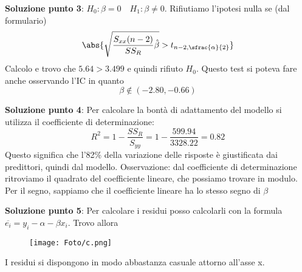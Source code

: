 \ind \textbf{Soluzione punto 3}: $H_0 :\beta = 0 \quad H_1 : \beta \neq 0$. Rifiutiamo l'ipotesi nulla se (dal formulario) $$\abs{\sqrt{\dfrac{S_{xx} (n-2)}{SS_R} \hat{\beta}} > t_{n-2, \sfrac{\alpha}{2}}}$$ Calcolo e trovo che $5.64 > 3.499$ e quindi rifiuto $H_0$. Questo test si poteva fare anche osservando l'IC in quanto $$\beta \notin(-2.80, -0.66) $$

\ind \textbf{Soluzione punto 4}: Per calcolare la bontà di adattamento del modello si utilizza il coefficiente di determinazione: $$R^2 = 1 - \frac{SS_R}{S_{yy}}= 1 - \frac{599.94}{3328.22} = 0.82$$ Questo significa che l'82\% della variazione delle risposte è giustificata dai predittori, quindi dal modello. Osservazione: dal coefficiente di determinazione ritroviamo il quadrato del coefficiente lineare, che possiamo trovare in modulo. Per il segno, sappiamo che il coefficiente lineare ha lo stesso segno di $\beta$ \n

\ind \textbf{Soluzione punto 5}: Per calcolare i residui posso calcolarli con la formula $ \overline{e_i} = y_i - \alpha -\beta x_i $. Trovo allora
\begin{figure}
    \centering
    \texttt{[image: Foto/c.png]}
\end{figure}
I residui si dispongono in modo abbastanza casuale attorno all'asse x. 